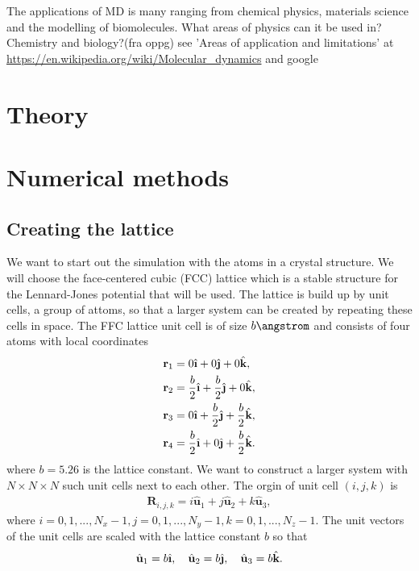 \documentclass[11pt,a4wide]{article}
\renewcommand{\vec}{\mathbf}
\newcommand{\ihat}{\hat{\textbf{\i}}}
\newcommand{\jhat}{\hat{\textbf{\j}}}
\newcommand{\khat}{\hat{\textbf{k}}}
\begin{document}
The applications of MD is many ranging from chemical physics, materials science and the modelling of biomolecules.
What areas of physics can it be used in? Chemistry and biology?(fra oppg)
see 'Areas of application and limitations' at \url{https://en.wikipedia.org/wiki/Molecular\_dynamics} and google




\section{Theory}


\section{Numerical methods}


\subsection{Creating the lattice}
We want to start out the simulation with the atoms in a crystal structure. We will choose the face-centered cubic (FCC) lattice which is a stable structure for the Lennard-Jones potential that will be used. The lattice is build up by unit cells, a group of attoms, so that a larger system can be created by repeating these cells in space. The FFC lattice unit cell is of size $b \angstrom $ and consists of four atoms with local coordinates
\begin{align}
	\vec r_1 &= 0 \ihat + 0 \jhat + 0 \khat,\\
	\vec r_2 &= \frac{b}{2} \ihat + \frac{b}{2} \jhat + 0 \khat,\\
	\vec r_3 &= 0 \ihat + \frac{b}{2} \jhat + \frac{b}{2} \khat,\\
	\vec r_4 &= \frac{b}{2} \ihat + 0 \jhat + \frac{b}{2} \khat.
\end{align}
where $b=5.26$ is the lattice constant. We want to construct a larger system with $N\times N\times N$ such unit cells next to each other. The orgin of unit cell $(i,j,k)$ is
\begin{align}
	\vec R_{i,j,k} = i \hat{\textbf{u}}_1 + j \hat{\textbf{u}}_2 + k \hat{\textbf{u}}_3,
\end{align}
where $i=0,1,..., N_x-1, j=0,1,..., N_y-1, k=0,1,..., N_z-1$. The unit vectors of the unit cells are scaled with the lattice constant $b$ so that
\begin{align}
	\hat{\textbf{u}}_1 = b\ihat, \quad \hat{\textbf{u}}_2 = b\jhat, \quad \hat{\textbf{u}}_3 = b\khat.
\end{align}
\end{document}
